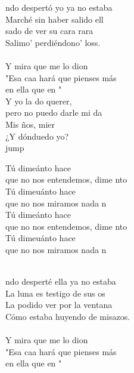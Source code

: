 \begin{cancion}%
	ndo despertó yo ya no estaba\\
	Marché sin haber salido ell\\
	sado de ver su cara rara\\
	Salimo' perdiéndono' loss.\\
	\jump\\
	Y mira que me lo dion\\
	"Esa caa hará que pienses más \\
	en ella que en "\\
	Y yo la do querer, \\
	pero no puedo darle mi da\\
	Mis ños, mier\\
	¿Y dónduedo yo?\\jump\\
	\begin{chorus}%
	Tú dimeánto hace \\
	que no nos entendemos, dime nto \\
	Tú dimeuánto hace  \\
	que no nos miramos nada n\\
	Tú dimeánto hace  \\
	que no nos entendemos, dime nto \\
	Tú dimeuánto hace  \\
	que no nos miramos nada n\\
	\end{chorus}%
	\jump\\
	ndo desperté ella ya no estaba\\
	La luna es testigo de sus os\\
	La podido ver por la ventana\\
	Cómo estaba huyendo de misazos.\\
	\jump\\
	Y mira que me lo dion\\
	"Esa caa hará que pienses más \\
	en ella que en "\\

\end{cancion}
